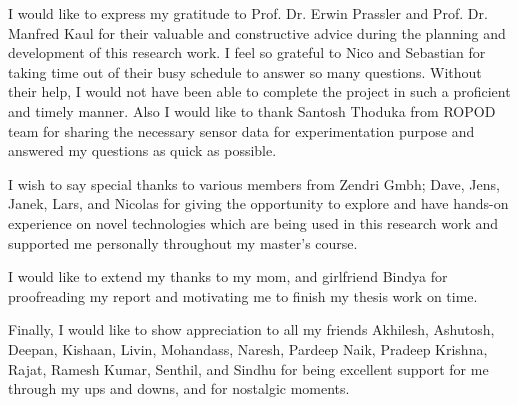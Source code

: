 

    \begin{acknowledgements}
		I would like to express my gratitude to Prof. Dr. Erwin Prassler and Prof. Dr. Manfred Kaul for their valuable and constructive advice during the planning and development of this research work. I feel so grateful to Nico and Sebastian for taking time out of their busy schedule to answer so many questions. Without their help, I would not have been able to complete the project in such a proficient and timely manner. Also I would like to thank Santosh Thoduka from ROPOD team for sharing the necessary sensor data for experimentation purpose and answered my questions as quick as possible.
		
		I wish to say special thanks to various members from Zendri Gmbh; Dave, Jens, Janek, Lars, and Nicolas for giving the opportunity to explore and have hands-on experience on novel technologies which are being used in this research work and supported me personally throughout my master's course.
		
		I would like to extend my thanks to my mom, and girlfriend Bindya for proofreading my report and motivating me to finish my thesis work on time.
		
		Finally, I would like to show appreciation to all my friends Akhilesh, Ashutosh, Deepan, Kishaan, Livin, Mohandass, Naresh, Pardeep Naik, Pradeep Krishna, Rajat, Ramesh Kumar, Senthil, and Sindhu for being excellent support for me through my ups and downs, and for nostalgic moments.

    \end{acknowledgements}

